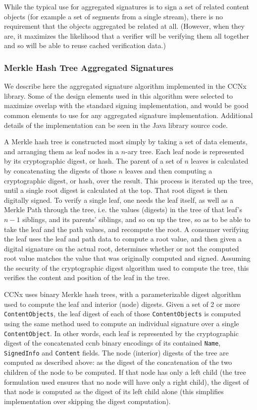 While the typical use for aggregated signatures is to sign a set of
related content objects (for example a set of segments from a single
stream), there is no requirement that the objects aggregated be
related at all. (However, when they are, it maximizes the likelihood
that a verifier will be verifying them all together and so will be
able to reuse cached verification data.)


\subsubsection{Merkle Hash Tree Aggregated Signatures}

We describe here the aggregated signature algorithm implemented in the
CCNx library. Some of the design elements used in this algorithm were
selected to maximize overlap with the standard signing implementation,
and would be good common elements to use for any aggregated signature
implementation. Additional details of the implementation can be seen
in the Java library source code.

A Merkle hash tree is constructed most simply by taking a set of data
elements, and arranging them as leaf nodes in a $n$-ary tree. Each
leaf node is represented by its cryptographic digest, or hash. The
parent of a set of $n$ leaves is calculated by concatenating the
digests of those $n$ leaves and then computing a cryptographic digest,
or hash, over the result. This process is iterated up the tree, until
a single root digest is calculated at the top. That root digest is
then digitally signed. To verify a single leaf, one needs the leaf
itself, as well as a Merkle Path through the tree, i.e. the values
(digests) in the tree of that leaf's $n-1$ siblings, and its parents'
siblings, and so on up the tree, so as to be able to take the leaf and
the path values, and recompute the root. A consumer verifying the leaf
uses the leaf and path data to compute a root value, and then given a
digital signature on the actual root, determines whether or not the
computed root value matches the value that was originally computed and
signed. Assuming the security of the cryptographic digest algorithm
used to compute the tree, this verifies the content and position of
the leaf in the tree.

CCNx uses binary Merkle hash trees, with a parameterizable digest
algorithm used to compute the leaf and interior (node) digests. Given
a set of 2 or more {\tt ContentObjects}, the leaf digest of each of
those {\tt ContentObjects} is computed using the same method used to
compute an individual signature over a single {\tt ContentObject}. In
other words, each leaf is represented by the cryptographic digest of
the concatenated ccnb binary encodings of its contained {\tt Name},
{\tt SignedInfo} and {\tt Content} fields. The node (interior) digests
of the tree are computed as described above: as the digest of the
concatenation of the two children of the node to be computed. If that
node has only a left child (the tree formulation used ensures that no
node will have only a right child), the digest of that node is
computed as the digest of its left child alone (this simplifies
implementation over skipping the digest computation).

